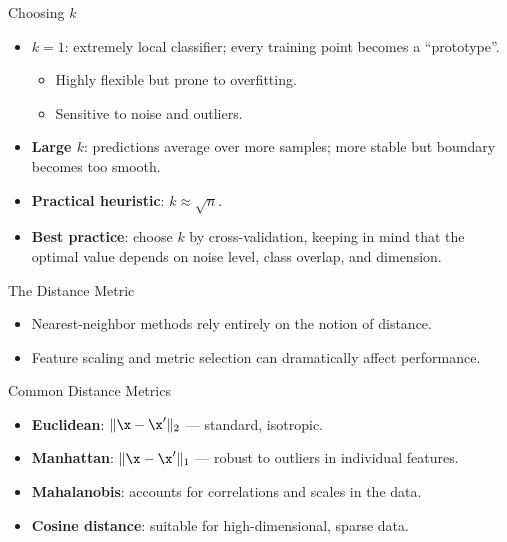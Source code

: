 \begin{frame}{Choosing $k$}
  \begin{itemize}
    \item \textbf{$k=1$}: extremely local classifier; every training point becomes a ``prototype''.
      \begin{itemize}
        \item Highly flexible but prone to \alert{overfitting}.
        \item Sensitive to noise and outliers.
      \end{itemize}
    \item \textbf{Large $k$}: predictions average over more samples; more stable but boundary becomes too smooth.
    \item \textbf{Practical heuristic}: $k \approx \sqrt{n}$.
    \item \textbf{Best practice}: choose $k$ by \alert{cross-validation}, keeping in mind that the optimal value depends on noise level, class overlap, and dimension.
  \end{itemize}
\end{frame}

\begin{frame}{The Distance Metric}
  \begin{itemize}
    \item Nearest-neighbor methods rely \alert{entirely} on the notion of distance.
    \item Feature scaling and metric selection can \alert{dramatically affect} performance.
  \end{itemize}
  \vspace{0.4em}
  \begin{block}{Common Distance Metrics}
    \begin{itemize}
      \item \textbf{Euclidean}: $\|\x - \x'\|_2$ — standard, isotropic.
      \item \textbf{Manhattan}: $\|\x - \x'\|_1$ — robust to outliers in individual features.
      \item \textbf{Mahalanobis}: accounts for correlations and scales in the data.
      \item \textbf{Cosine distance}: suitable for high-dimensional, sparse data.
    \end{itemize}
  \end{block}
\end{frame}

